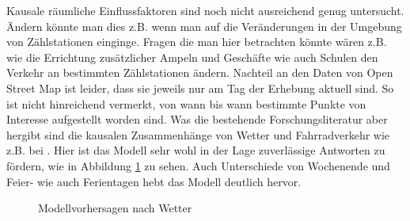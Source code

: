 \documentclass[a4paper,12pt]{thesis}
\begin{document}
Kausale räumliche Einflussfaktoren sind noch nicht ausreichend genug untersucht. Ändern könnte man dies z.B. wenn man auf die Veränderungen in der Umgebung von Zählstationen einginge. Fragen die man hier betrachten könnte wären z.B. wie die Errichtung zusätzlicher Ampeln und Geschäfte wie auch Schulen den Verkehr an bestimmten Zählstationen ändern. Nachteil an den Daten von Open Street Map ist leider, dass sie jeweils nur am Tag der Erhebung aktuell sind. So ist nicht hinreichend vermerkt, von wann bis wann bestimmte Punkte von Interesse aufgestellt worden sind. Was die bestehende Forschungsliteratur aber hergibt sind die kausalen Zusammenhänge von Wetter und Fahrradverkehr wie z.B. bei \cite{Wessel2020}. Hier ist das Modell sehr wohl in der Lage zuverlässige Antworten zu fördern, wie in Abbildung \ref{fig:Temperaturunterschied} zu sehen. Auch Unterschiede von Wochenende und Feier- wie auch Ferientagen hebt das Modell deutlich hervor.

\begin{figure}%
	\centering
	
	\caption{Modellvorhersagen nach Wetter}%
	\label{fig:Temperaturunterschied}%
\end{figure}
\end{document}
